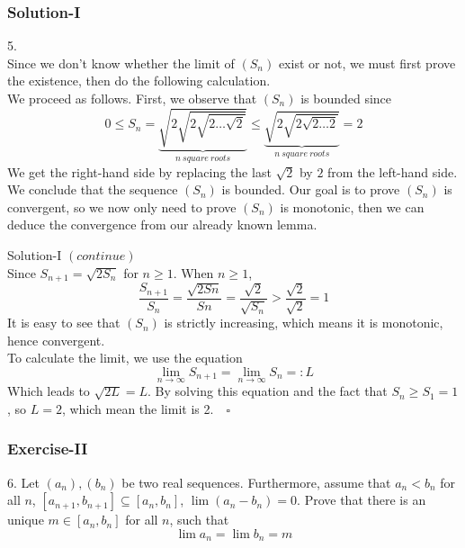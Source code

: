 \documentclass[12pt, t]{beamer}
\begin{document}
\begin{frame}
    \frametitle{Solution-I}
5.\\
\hspace{1em} Since we don't know whether the limit of $(S_n)$ exist or not, we must first prove the existence, then do the following
calculation.\\
\hspace{1em} We proceed as follows. First, we observe that $(S_n)$ is bounded since
\begin{equation*}
    0\leq S_n=\underbrace{\sqrt{2\sqrt{2\sqrt{2\dots\sqrt{2}}}}}_{n\ square\ roots} \leq \underbrace{\sqrt{2\sqrt{2\sqrt{2\dots 2}}}}_{n\ square\ roots}=2
\end{equation*}
We get the right-hand side by replacing the last $\sqrt{2}$ by $2$ 
from the left-hand side.\\
\hspace{1em} We conclude that the sequence $(S_n)$ is bounded. Our goal is to prove $(S_n)$ is convergent, so we now only need to prove 
$(S_n)$ is monotonic, then we can deduce the convergence from our already known lemma.
\end{frame}

\begin{frame}{Solution-I}
$(continue)$\\
\hspace{1em} Since $S_{n+1}=\sqrt{2S_n}$ for $n\geq 1$. When $n\geq 1$,
\begin{equation*}
    \frac{S_{n+1}}{S_n}=\frac{\sqrt{2Sn}}{Sn}=\frac{\sqrt{2}}{\sqrt{S_n}}>\frac{\sqrt{2}}{\sqrt{2}}=1
\end{equation*}
\hspace{1em} It is easy to see that $(S_n)$ is strictly increasing, which means it is monotonic, 
hence convergent.\\
\hspace{1em} To calculate the limit, we use the equation 
\begin{equation*}
    \lim_{n\rightarrow\infty} S_{n+1}=\lim_{n\rightarrow\infty} S_n =: L
\end{equation*}
\hspace{1em} Which leads to $\sqrt{2L}=L$. By solving this equation and the fact that $S_n\geq S_1=1$, so $L=2$, which mean the limit is 2.$\quad \square$ 

\end{frame}


\begin{frame}
    \frametitle{Exercise-II}
6. Let $(a_n),(b_n)$ be two real sequences. Furthermore, assume that $a_n<b_n$
for all $n$, $[a_{n+1}, b_{n+1}]\subseteq [a_n,b_n]$, $\lim (a_n-b_n)=0$. Prove that there 
is an unique $m\in [a_n,b_n]$ for all $n$, such that 
\begin{equation*}
    \lim a_n=\lim b_n=m
\end{equation*}
\end{frame}
\end{document}
